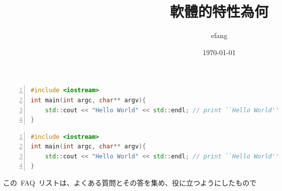 \documentclass[12pt, fleqn]{article}
\begin{document}
\begin{CJK*}{UTF8}{}
    \title{\textbf{軟體的特性為何}}
    \author{efang}
    \date{\today}
    \maketitle


\begin{lstlisting}[title={hello.cpp}, frameround=tfff, columns=fullflexible, numberstyle=\tiny,stepnumber=5, frame=single, basicstyle={\ttfamily \small}, numbers=left, commentstyle={\sffamily}, language=c++]
#include <iostream>
int main(int argc, char** argv){
    std::cout << "Hello World" << std::endl; // print ``Hello World''
}
\end{lstlisting}

\begin{lstlisting}[title={hello.cpp},
                   frameround=tfff,
                   columns=fullflexible,
                   numberstyle=\tiny,
                   stepnumber=5,
                   frame=single,
                   basicstyle={\ttfamily \small},
                   numbers=left,
                   commentstyle={\sffamily},
                   language=c++]
#include <iostream>
int main(int argc, char** argv){
    std::cout << "Hello World" << std::endl; // print ``Hello World''
}
\end{lstlisting}
この~FAQ~リストは、よくある質問とその答を集め、役に立つようにしたもので


\end{CJK*}
\end{document}
